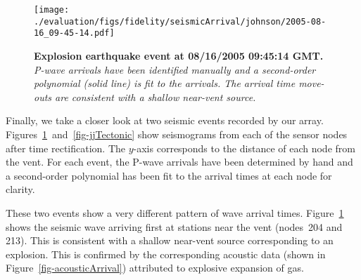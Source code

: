 %

\begin{figure}[t]
\begin{center}
\texttt{[image: ./evaluation/figs/fidelity/seismicArrival/johnson/2005-08-16\_09-45-14.pdf]}
\end{center}
\caption{\small{\bf Explosion earthquake event at 08/16/2005 09:45:14 GMT.}
{\em P-wave arrivals have been identified manually and a second-order
polynomial (solid line) is fit to the arrivals. The arrival time
move-outs are consistent with a shallow near-vent source.}}
\label{fig-jjExplosion}
\end{figure}


Finally, we take a closer look at two seismic events recorded by our
array.  Figures~\ref{fig-jjExplosion}~and~\ref{fig-jjTectonic} show
seismograms from each of the sensor nodes after time rectification.
The $y$-axis corresponds to the distance of each node from the vent.
For each event, the P-wave arrivals have been determined by hand and a
second-order polynomial has been fit to the arrival times at each node
for clarity.

These two events show a very different pattern of wave arrival
times. Figure~\ref{fig-jjExplosion} shows the seismic wave
arriving first at stations near the vent (nodes~204 and 213). This
is consistent with a shallow near-vent source corresponding to an
explosion. This is confirmed by the corresponding acoustic data (shown
in Figure~\ref{fig-acousticArrival}) attributed to explosive expansion
of gas. 

